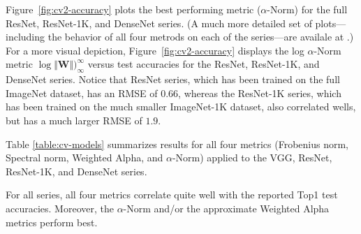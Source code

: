 Figure~\ref{fig:cv2-accuracy} plots the best performing metric ($\alpha$-Norm) for the full ResNet, ResNet-1K, and DenseNet series.
(A much more detailed set of plots---including the behavior of all four metrods on each of the series---are availale at .)
For a more visual depiction, Figure~\ref{fig:cv2-accuracy} displays the log $\alpha$-Norm metric  $\log\Vert\mathbf{W}\Vert)_{\infty}^{\infty}$ versus test accuracies for the ResNet, ResNet-1K, and DenseNet series. 
Notice that ResNet series, which has been trained on the full
ImageNet dataset, has an RMSE of $0.66$, whereas the ResNet-1K series, which has been trained on the much smaller ImageNet-1K dataset,
also correlated wells, but has a much larger RMSE of $1.9$.

Table \ref{table:cv-models} summarizes results for all four metrics (Frobenius norm, Spectral norm, Weighted Alpha, and $\alpha$-Norm) applied to the VGG, ResNet, ResNet-1K, and DenseNet series.

For all series, all four metrics correlate quite well with the reported Top1 test accuracies.  
Moreover, the $\alpha$-Norm and/or the approximate Weighted Alpha metrics perform best.



